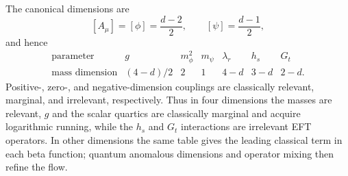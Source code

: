 \begin{enumerate}
\begin{enumerate}
\begin{enumerate}
          The canonical dimensions are
          \[
            [A_\mu]=[\phi]=\frac{d-2}{2},\qquad
            [\psi]=\frac{d-1}{2},
          \]
          and hence
          \[
          \begin{array}{c|cccccc}
            \text{parameter}&g&m_\phi^2&m_\psi&\lambda_r&h_s&G_t\\ \hline
            \text{mass dimension}&(4-d)/2&2&1&4-d&3-d&2-d.
          \end{array}
          \]
          Positive-, zero-, and negative-dimension couplings are
          classically relevant, marginal, and irrelevant, respectively.
          Thus in four dimensions the masses are relevant, \(g\) and the
          scalar quartics are classically marginal and acquire logarithmic
          running, while the \(h_s\) and \(G_t\) interactions are
          irrelevant EFT operators.  In other dimensions the same table
          gives the leading classical term in each beta function; quantum
          anomalous dimensions and operator mixing then refine the flow.


\end{enumerate}
\end{enumerate}
\end{enumerate}
